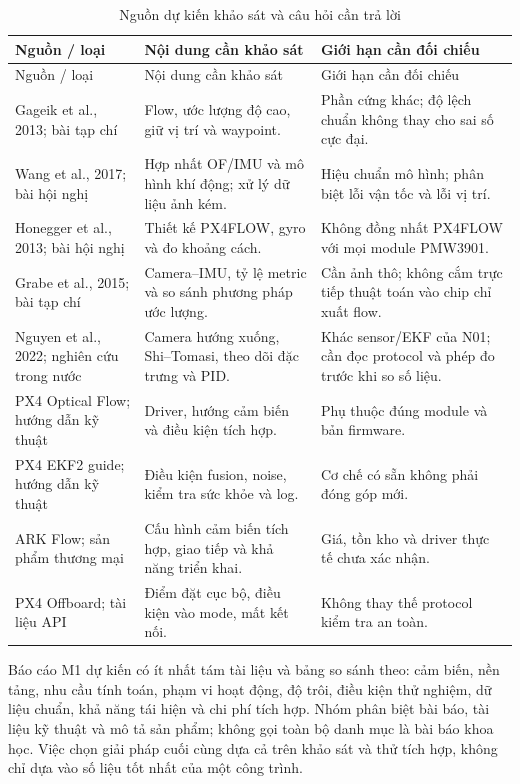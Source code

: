 \documentclass[a4paper,12pt]{article}
\newcommand{\tblfont}{\setstretch{1.08}\fontsize{13}{16}\selectfont}
\begin{document}
\begingroup\tblfont
\begin{longtable}{L{4.1cm}L{5.1cm}L{4.5cm}}
\caption{Nguồn dự kiến khảo sát và câu hỏi cần trả lời}\label{tab:lit}\\
\toprule Nguồn / loại & Nội dung cần khảo sát & Giới hạn cần đối chiếu\\\midrule\endfirsthead
\toprule Nguồn / loại & Nội dung cần khảo sát & Giới hạn cần đối chiếu\\\midrule\endhead
Gageik et al., 2013\cite{gageik}; bài tạp chí & Flow, ước lượng độ cao, giữ vị trí và waypoint. & Phần cứng khác; độ lệch chuẩn không thay cho sai số cực đại.\\
Wang et al., 2017\cite{wang}; bài hội nghị & Hợp nhất OF/IMU và mô hình khí động; xử lý dữ liệu ảnh kém. & Hiệu chuẩn mô hình; phân biệt lỗi vận tốc và lỗi vị trí.\\
Honegger et al., 2013\cite{honegger}; bài hội nghị & Thiết kế PX4FLOW, gyro và đo khoảng cách. & Không đồng nhất PX4FLOW với mọi module PMW3901.\\
Grabe et al., 2015\cite{grabe}; bài tạp chí & Camera--IMU, tỷ lệ metric và so sánh phương pháp ước lượng. & Cần ảnh thô; không cắm trực tiếp thuật toán vào chip chỉ xuất flow.\\
Nguyen et al., 2022\cite{vn}; nghiên cứu trong nước & Camera hướng xuống, Shi--Tomasi, theo dõi đặc trưng và PID. & Khác sensor/EKF của N01; cần đọc protocol và phép đo trước khi so số liệu.\\
PX4 Optical Flow\cite{flow}; hướng dẫn kỹ thuật & Driver, hướng cảm biến và điều kiện tích hợp. & Phụ thuộc đúng module và bản firmware.\\
PX4 EKF2 guide\cite{ekf}; hướng dẫn kỹ thuật & Điều kiện fusion, noise, kiểm tra sức khỏe và log. & Cơ chế có sẵn không phải đóng góp mới.\\
ARK Flow\cite{ark}; sản phẩm thương mại & Cấu hình cảm biến tích hợp, giao tiếp và khả năng triển khai. & Giá, tồn kho và driver thực tế chưa xác nhận.\\
PX4 Offboard\cite{offboard}; tài liệu API & Điểm đặt cục bộ, điều kiện vào mode, mất kết nối. & Không thay thế protocol kiểm tra an toàn.\\
\bottomrule
\end{longtable}\endgroup

Báo cáo M1 dự kiến có ít nhất tám tài liệu và bảng so sánh theo: cảm biến, nền tảng, nhu cầu tính toán, phạm vi hoạt động, độ trôi, điều kiện thử nghiệm, dữ liệu chuẩn, khả năng tái hiện và chi phí tích hợp. Nhóm phân biệt bài báo, tài liệu kỹ thuật và mô tả sản phẩm; không gọi toàn bộ danh mục là bài báo khoa học. Việc chọn giải pháp cuối cùng dựa cả trên khảo sát và thử tích hợp, không chỉ dựa vào số liệu tốt nhất của một công trình.
\end{document}
